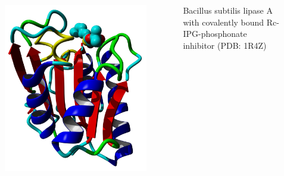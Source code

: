 \documentclass[english]{beamer}
\begin{document}
\begin{frame}
\begin{columns}[t]
        \begin{figure}
            \includegraphics[width=.9\linewidth]{figures/Lipase.png}
        \end{figure}     
        \tiny Bacillus subtilis lipase A with covalently bound Rc-IPG-phosphonate inhibitor (PDB: 1R4Z)

    \end{columns} 

\end{frame}

\end{document}
